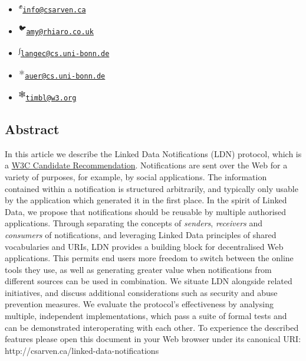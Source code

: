\documentclass[]{article}
\begin{document}
\begin{itemize}
\item
  \hypertarget{author-email-1}{}

  \textsuperscript{✊}\href{mailto:info@csarven.ca}{\nolinkurl{info@csarven.ca}}
\item
  \hypertarget{author-email-2}{}

  \textsuperscript{🐦}\href{mailto:amy@rhiaro.co.uk}{\nolinkurl{amy@rhiaro.co.uk}}
\item
  \hypertarget{author-email-3}{}

  \textsuperscript{∫}\href{mailto:langec@cs.uni-bonn.de}{\nolinkurl{langec@cs.uni-bonn.de}}
\item
  \hypertarget{author-email-4}{}

  \textsuperscript{⚛}\href{mailto:auer@cs.uni-bonn.de}{\nolinkurl{auer@cs.uni-bonn.de}}
\item
  \hypertarget{author-email-5}{}

  \textsuperscript{🕸}\href{mailto:timbl@w3.org}{\nolinkurl{timbl@w3.org}}
\end{itemize}

\hypertarget{content}{}
\hypertarget{abstract}{}
\subsection{Abstract}\label{abstract}

In this article we describe the Linked Data Notifications (LDN)
protocol, which is a \href{https://www.w3.org/TR/ldn/}{W3C Candidate
Recommendation}. Notifications are sent over the Web for a variety of
purposes, for example, by social applications. The information contained
within a notification is structured arbitrarily, and typically only
usable by the application which generated it in the first place. In the
spirit of Linked Data, we propose that notifications should be reusable
by multiple authorised applications. Through separating the concepts of
\emph{senders}, \emph{receivers} and \emph{consumers} of notifications,
and leveraging Linked Data principles of shared vocabularies and URIs,
LDN provides a building block for decentralised Web applications. This
permits end users more freedom to switch between the online tools they
use, as well as generating greater value when notifications from
different sources can be used in combination. We situate LDN alongside
related initiatives, and discuss additional considerations such as
security and abuse prevention measures. We evaluate the protocol's
effectiveness by analysing multiple, independent implementations, which
pass a suite of formal tests and can be demonstrated interoperating with
each other. To experience the described features please open this
document in your Web browser under its canonical URI:
http://csarven.ca/linked-data-notifications
\end{document}
